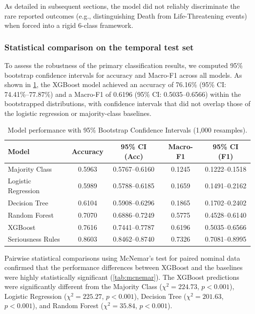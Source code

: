 \documentclass[10pt]{article}
\begin{document}
As detailed in subsequent sections, the model did not reliably discriminate the rare reported outcomes (e.g., distinguishing Death from Life-Threatening events) when forced into a rigid 6-class framework.

\subsubsection{Statistical comparison on the temporal test set}
To assess the robustness of the primary classification results, we computed 95\% bootstrap confidence intervals for accuracy and Macro-F1 across all models. As shown in \cref{tab:bootstrap_ci}, the XGBoost model achieved an accuracy of 76.16\% (95\% CI: 74.41\%--77.87\%) and a Macro-F1 of 0.6196 (95\% CI: 0.5035--0.6566) within the bootstrapped distributions, with confidence intervals that did not overlap those of the logistic regression or majority-class baselines.

\begin{table}[htbp]
\centering
\caption{Model performance with 95\% Bootstrap Confidence Intervals (1,000 resamples).}
\label{tab:bootstrap_ci}
\begin{tabular}{|l|c|c|c|c|}
\hline
\textbf{Model} & \textbf{Accuracy} & \textbf{95\% CI (Acc)} & \textbf{Macro-F1} & \textbf{95\% CI (F1)} \\
\hline
Majority Class & 0.5963 & 0.5767--0.6160 & 0.1245 & 0.1222--0.1518 \\
Logistic Regression & 0.5989 & 0.5788--0.6185 & 0.1659 & 0.1491--0.2162 \\
Decision Tree & 0.6104 & 0.5908--0.6296 & 0.1865 & 0.1702--0.2402 \\
Random Forest & 0.7070 & 0.6886--0.7249 & 0.5775 & 0.4528--0.6140 \\
XGBoost & 0.7616 & 0.7441--0.7787 & 0.6196 & 0.5035--0.6566 \\
Seriousness Rules & 0.8603 & 0.8462--0.8740 & 0.7326 & 0.7081--0.8995 \\
\hline
\end{tabular}
\end{table}

Pairwise statistical comparisons using McNemar's test for paired nominal data confirmed that the performance differences between XGBoost and the baselines were highly statistically significant (\cref{tab:mcnemar}). The XGBoost predictions were significantly different from the Majority Class ($\chi^2 = 224.73$, $p < 0.001$), Logistic Regression ($\chi^2 = 225.27$, $p < 0.001$), Decision Tree ($\chi^2 = 201.63$, $p < 0.001$), and Random Forest ($\chi^2 = 35.84$, $p < 0.001$). 
\end{document}
